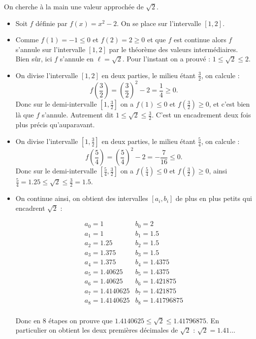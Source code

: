\documentclass[11pt,class=report,crop=false]{standalone}
\begin{document}
\begin{cours}[Dichotomie]
\begin{exemple}
On cherche \og{}à la main\fg{} une valeur approchée de $\sqrt{2}$.

\begin{itemize}
  \item Soit $f$ définie par $f(x)=x^2-2$. On se place sur l'intervalle $[1,2]$.
  \item Comme $f(1)=-1\le0$ et $f(2)=2\ge0$ et que $f$ est continue alors $f$ s'annule sur l'intervalle $[1,2]$ par le théorème des valeurs intermédiaires. Bien sûr, ici $f$ s'annule en $\ell = \sqrt{2}$. Pour l'instant on a prouvé : $1 \le \sqrt 2 \le 2$.
  \item On divise l'intervalle $[1,2]$ en deux parties, le milieu étant $\frac32$, on calcule :
  $$f\left(\frac32\right)= \left(\frac32\right)^2-2 = \frac14 \ge 0.$$
  Donc sur le demi-intervalle $[1,\frac32]$ on a $f(1) \le 0$ et $f(\frac32) \ge 0$, et c'est bien là que $f$ s'annule. Autrement dit 
  $1 \le \sqrt{2} \le \frac32$. C'est un encadrement deux fois plus précis qu'auparavant.
  
  \item On divise l'intervalle $[1,\frac32]$ en deux parties, le milieu étant $\frac54$, on calcule :
  $$f\left(\frac54\right)= \left(\frac54\right)^2-2 = -\frac{7}{16} \le 0.$$
  Donc sur le demi-intervalle $[\frac54,\frac32]$ on a 
  $f(\frac54) \le 0$ et $f(\frac32) \ge 0$, ainsi 
  $\frac54 = 1.25 \le \sqrt{2} \le \frac32 = 1.5$.
  
  \item On continue ainsi, on obtient des intervalles $[a_i,b_i]$ de plus en plus petits qui encadrent $\sqrt2$ :

$$
\begin{array}{ll}
  a_0 = 1      & b_0 = 2 \\
  a_1 = 1      & b_1 = 1.5 \\
  a_2 = 1.25   & b_2 = 1.5 \\
  a_3 = 1.375  & b_3 = 1.5 \\
  a_4 = 1.375  & b_4 = 1.4375 \\
  a_5 = 1.40625 & b_5 = 1.4375 \\
  a_6 = 1.40625 & b_6 = 1.421875 \\
  a_7 = 1.4140625 & b_7 = 1.421875 \\
  a_8 = 1.4140625 & b_8 = 1.41796875 \\
\end{array}
$$

Donc en $8$ étapes on prouve que $1.4140625 \le \sqrt2 \le 1.41796875$. En particulier on obtient les deux premières décimales de $\sqrt2$ : $\sqrt2 = 1.41\ldots$
\end{itemize}


\end{exemple}

\end{cours}
\end{document}
